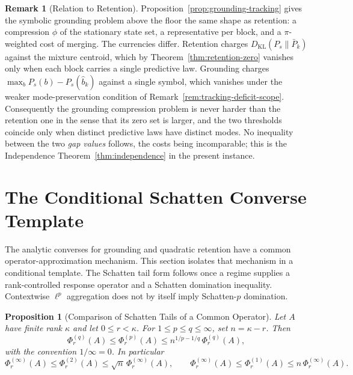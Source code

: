 \documentclass[12pt]{article}
\newtheorem{proposition}[theorem]{Proposition}
\theoremstyle{definition}
\newtheorem{remark}[theorem]{Remark}
\begin{document}
\begin{remark}[Relation to Retention]
\label{rem:tracking-vs-retention}
Proposition~\ref{prop:grounding-tracking} gives the symbolic grounding problem
above the floor the same shape as retention: a compression $\phi$ of the
stationary state set, a representative per block, and a $\pi$-weighted cost of
merging.  The currencies differ.  Retention charges
$D_{\mathrm{KL}}(P_s\|\bar P_k)$ against the mixture centroid, which by
Theorem~\ref{thm:retention-zero} vanishes only when each block carries a single
predictive law.  Grounding charges $\max_bP_s(b)-P_s(\hat b_k)$ against a
single symbol, which vanishes under the weaker mode-preservation condition of
Remark~\ref{rem:tracking-deficit-scope}.  Consequently the grounding
compression problem is never harder than the retention one in the sense that
its zero set is larger, and the two thresholds coincide only when distinct
predictive laws have distinct modes.  No inequality between the two \emph{gap
values} follows, the costs being incomparable; this is the Independence
Theorem~\ref{thm:independence} in the present instance.
\end{remark}

\section{The Conditional Schatten Converse Template}
\label{sec:schatten}

The analytic converses for grounding and quadratic retention have a common
operator-approximation mechanism.  This section isolates that mechanism in a
conditional template.  The Schatten tail form follows once a regime supplies a
rank-controlled response operator and a Schatten domination inequality.
Contextwise $\ell^p$ aggregation does not by itself imply Schatten-$p$
domination.

\begin{proposition}[Comparison of Schatten Tails of a Common Operator]
\label{prop:common-operator}
Let $A$ have finite rank $\kappa$ and let $0\le r<\kappa$.  For
$1\le p\le q\le\infty$, set $n=\kappa-r$.  Then
\[
\Phi^{(q)}_r(A)
\le
\Phi^{(p)}_r(A)
\le
n^{1/p-1/q}\,
\Phi^{(q)}_r(A),
\]
with the convention $1/\infty=0$.  In particular
\[
\Phi^{(\infty)}_r(A)
\le
\Phi^{(2)}_r(A)
\le
\sqrt n\,\Phi^{(\infty)}_r(A),
\qquad
\Phi^{(\infty)}_r(A)
\le
\Phi^{(1)}_r(A)
\le
n\,\Phi^{(\infty)}_r(A).
\]
\end{proposition}
\end{document}
